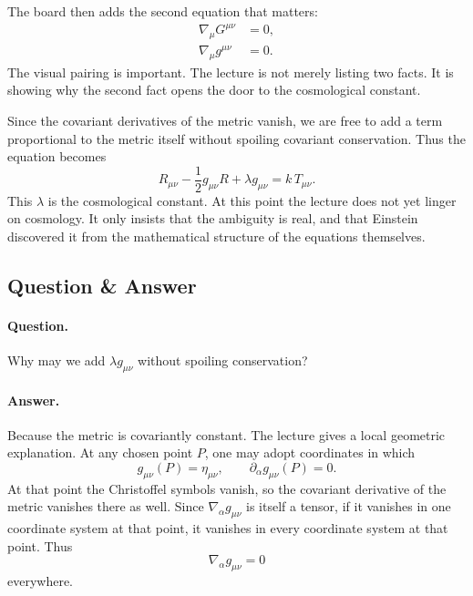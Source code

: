 The board then adds the second equation that matters:
\begin{align}
\nabla_\mu G^{\mu\nu} &= 0, \\
\nabla_\mu g^{\mu\nu} &= 0.
\end{align}
The visual pairing is important. The lecture is not merely listing two facts. It is showing why the second fact opens the door to the cosmological constant.

Since the covariant derivatives of the metric vanish, we are free to add a term proportional to the metric itself without spoiling covariant conservation. Thus the equation becomes
\begin{equation}
R_{\mu\nu}-\frac12 g_{\mu\nu}R+\lambda g_{\mu\nu}=k\,T_{\mu\nu}.
\end{equation}
This \(\lambda\) is the cosmological constant. At this point the lecture does not yet linger on cosmology. It only insists that the ambiguity is real, and that Einstein discovered it from the mathematical structure of the equations themselves.

\subsection{Question \& Answer}

\paragraph{Question.} Why may we add \(\lambda g_{\mu\nu}\) without spoiling conservation?

\paragraph{Answer.} Because the metric is covariantly constant. The lecture gives a local geometric explanation. At any chosen point \(P\), one may adopt coordinates in which
\begin{equation}
g_{\mu\nu}(P)=\eta_{\mu\nu},
\qquad
\partial_\alpha g_{\mu\nu}(P)=0.
\end{equation}
At that point the Christoffel symbols vanish, so the covariant derivative of the metric vanishes there as well. Since \(\nabla_\alpha g_{\mu\nu}\) is itself a tensor, if it vanishes in one coordinate system at that point, it vanishes in every coordinate system at that point. Thus
\begin{equation}
\nabla_\alpha g_{\mu\nu}=0
\end{equation}
everywhere.

